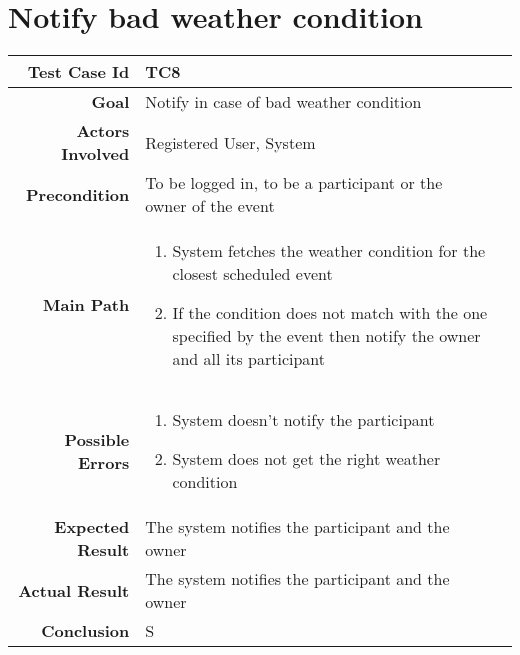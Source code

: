 \section{Notify bad weather condition}
\begin{tabularx}{\linewidth}{|r|X|X|}
\hline   {\bf Test Case Id} &  TC8\\
  \hline  {\bf Goal} & Notify in case of bad weather condition\\
  \hline  {\bf Actors Involved} & Registered User, System\\
  \hline  {\bf Precondition} & To be logged in, to be a participant or the owner of the event\\ 
   \hline  {\bf Main Path} & \begin{enumerate} 
   \item System fetches the weather condition for the closest scheduled event
    \item If the condition does not match with the one specified by the event then notify the owner and all its participant
   \end{enumerate}\\
   \hline  {\bf Possible Errors} & \begin{enumerate} 
   \item System doesn't notify the participant
   \item System does not get the right weather condition 
   \end{enumerate}\\
  \hline  {\bf Expected Result} & The system notifies the participant and the owner\\
  \hline  {\bf Actual Result} & The system notifies the participant and the owner\\
  \hline  {\bf Conclusion} & S\\
  \hline
  
\end{tabularx}

